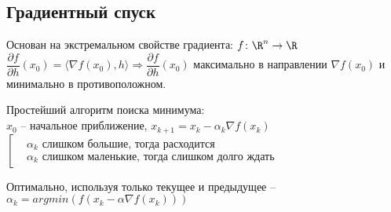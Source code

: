 \subsection{Градиентный спуск}

Основан на экстремальном свойстве градиента: $f \colon \R^n \to \R$\\
$\dfrac{\partial f}{\partial h}(x_0) = \langle \nabla f(x_0), h \rangle \Rightarrow \dfrac{\partial f}{\partial h}(x_0)$ максимально в направлении $\nabla f(x_0)$ и минимально в противоположном.

Простейший алгоритм поиска минимума:\\
$x_0$ -- начальное приближение, $x_{k + 1} = x_k - \alpha_k \nabla f(x_k)$\\
$\left[\begin{aligned}
&\alpha_k \text{ слишком большие, тогда расходится} \\
&\alpha_k \text{ слишком маленькие, тогда слишком долго ждать}
\end{aligned}\right.$

Оптимально, используя только текущее и предыдущее -- $\alpha_k = argmin (f(x_k - \alpha \nabla f(x_k)))$

